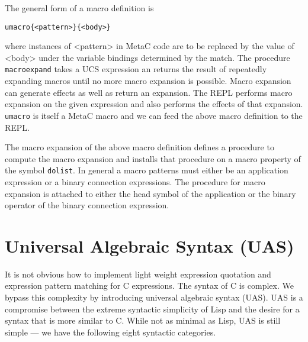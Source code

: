 \documentclass{article}
\begin{document}
The general form of a macro definition is
\begin{verbatim}
umacro{<pattern>}{<body>}
\end{verbatim}
where instances of <pattern> in MetaC code are to be replaced by the value of <body> under the variable bindings determined by the match.  The procedure {\tt macroexpand} takes a UCS expression
an returns the result of repeatedly expanding macros until no more macro expansion is possible.  Macro expansion can generate effects as well as return an expansion.  The REPL performs
macro expansion on the given expression and also performs the effects of that expansion.  {\tt umacro} is itself a MetaC macro and we can feed the above macro definition to the REPL.

The macro expansion of the above macro definition defines a procedure to compute the macro expansion and installs that procedure on a macro property of the symbol {\tt dolist}.
In general a macro patterns must either be an application expression or a binary connection expressions.  The procedure for macro expansion is attached to either the head symbol of the application
or the binary operator of the binary connection expression.

\section{Universal Algebraic Syntax (UAS)}

It is not obvious how to implement light weight expression quotation and expression pattern matching for C expressions.  The syntax of C is complex.  We bypass this complexity by introducing universal algebraic syntax (UAS).
UAS is a compromise between the extreme syntactic simplicity of Lisp and the desire for a syntax that is more similar to C.
While not as minimal as Lisp, UAS is still simple --- we have the following eight syntactic categories.
\end{document}
